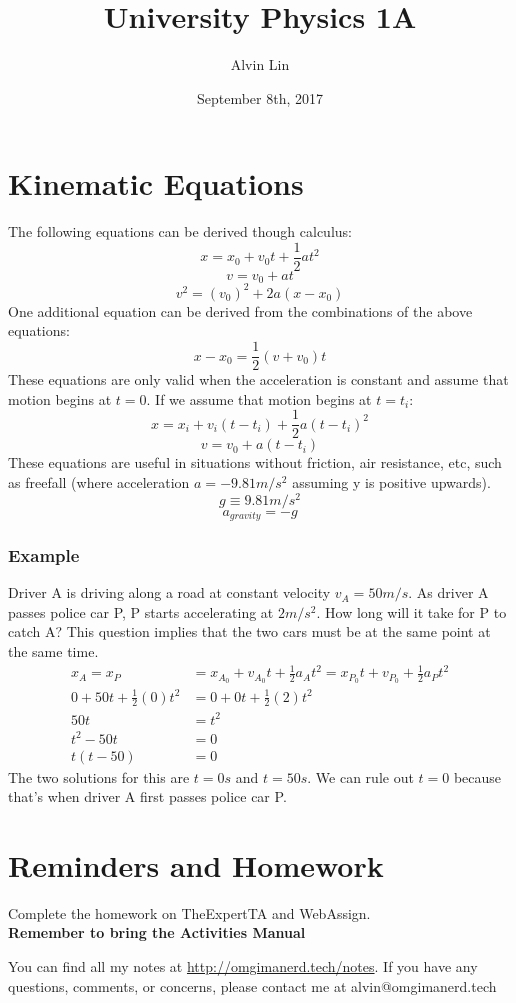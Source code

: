 \documentclass{math}
\title{University Physics 1A}
\author{Alvin Lin}
\date{September 8th, 2017}
\begin{document}
\maketitle

\section*{Kinematic Equations}
The following equations can be derived though calculus:
\[ x = x_0+v_0t+\frac{1}{2}at^2 \]
\[ v = v_0+at \]
\[ v^2 = (v_0)^2+2a(x-x_0) \]
One additional equation can be derived from the combinations of the above
equations:
\[ x-x_0 = \frac{1}{2}(v+v_0)t \]
These equations are only valid when the acceleration is constant and assume that
motion begins at \( t = 0 \). If we assume that motion begins at \( t = t_i \):
\[ x = x_i+v_i(t-t_i)+\frac{1}{2}a(t-t_i)^2 \]
\[ v = v_0+a(t-t_i) \]
These equations are useful in situations without friction, air resistance, etc,
such as freefall (where acceleration \( a = -9.81m/s^2 \) assuming y is
positive upwards).
\[ g \equiv 9.81m/s^2 \]
\[ a_{gravity} = -g \]

\subsubsection*{Example}
Driver A is driving along a road at constant velocity \( v_A = 50m/s \). As
driver A passes police car P, P starts accelerating at \( 2m/s^2 \). How long
will it take for P to catch A? This question implies that the two cars must be
at the same point at the same time.
\begin{align*}
  x_A = x_P &= x_{A_0}+v_{A_0}t+\frac{1}{2}a_At^2 =
    x_{P_0}t+v_{P_0}+\frac{1}{2}a_Pt^2 \\
  0+50t+\frac{1}{2}(0)t^2 &= 0+0t+\frac{1}{2}(2)t^2 \\
  50t &= t^2 \\
  t^2-50t &= 0 \\
  t(t-50) &= 0
\end{align*}
The two solutions for this are \( t = 0s \) and \( t = 50s \). We can rule out
\( t = 0 \) because that's when driver A first passes police car P.

\section*{Reminders and Homework}
Complete the homework on TheExpertTA and WebAssign. \\
\textbf{Remember to bring the Activities Manual}

\begin{center}
  You can find all my notes at \url{http://omgimanerd.tech/notes}. If you have
  any questions, comments, or concerns, please contact me at
  alvin@omgimanerd.tech
\end{center}
\end{document}
